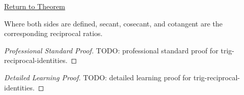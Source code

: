\newpage
{}
\label{prf:trig-reciprocal-identities}

\begin{remark*}[Return]
\hyperref[thm:trig-reciprocal-identities]{Return to Theorem}
\end{remark*}

\begin{theorem*}
Where both sides are defined, secant, cosecant, and cotangent are the
corresponding reciprocal ratios.
\end{theorem*}

\begin{proof}[Professional Standard Proof]
\LRAProofBodyStart
TODO: professional standard proof for trig-reciprocal-identities.
\end{proof}

\begin{proof}[Detailed Learning Proof]
\LRAProofBodyStart
TODO: detailed learning proof for trig-reciprocal-identities.
\end{proof}

\clearpage
